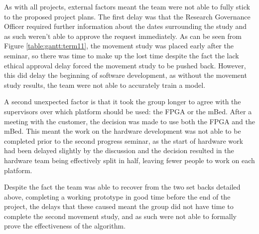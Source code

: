 As with all projects, external factors meant the team were not able to fully stick to the proposed project plans. The first delay was that the Research Governance Officer required further information about the dates surrounding the study and as such weren't able to approve the request immediately. As can be seen from Figure \ref{table:gantt:term11}, the movement study was placed early after the seminar, so there was time to make up the lost time despite the fact the lack ethical approval delay forced the movement study to be pushed back. However, this did delay the beginning of software development, as without the movement study results, the team were not able to accurately train a model.

A second unexpected factor is that it took the group longer to agree with the supervisors over which platform should be used: the FPGA or the mBed. After a meeting with the customer, the decision was made to use both the FPGA and the mBed. This meant the work on the hardware development was not able to be completed prior to the second progress seminar, as the start of hardware work had been delayed slightly by the discussion and the decision resulted in the hardware team being effectively split in half, leaving fewer people to work on each platform.

Despite the fact the team was able to recover from the two set backs detailed above, completing a working prototype in good time before the end of the project, the delays that these caused meant the group did not have time to complete the second movement study, and as such were not able to formally prove the effectiveness of the algorithm.
